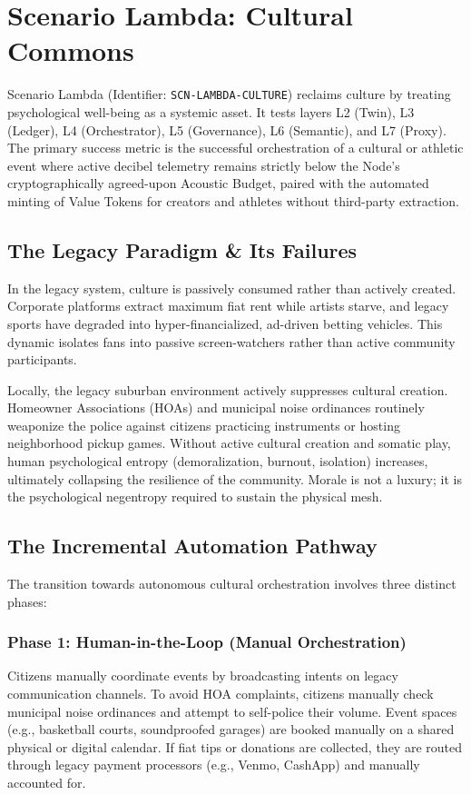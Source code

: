 \chapter{Scenario Lambda: Cultural Commons}
\label{ch:scenario_lambda}

Scenario Lambda (Identifier: \texttt{SCN-LAMBDA-CULTURE}) reclaims culture by treating psychological well-being as a systemic asset. It tests layers L2 (Twin), L3 (Ledger), L4 (Orchestrator), L5 (Governance), L6 (Semantic), and L7 (Proxy). The primary success metric is the successful orchestration of a cultural or athletic event where active decibel telemetry remains strictly below the Node's cryptographically agreed-upon Acoustic Budget, paired with the automated minting of Value Tokens for creators and athletes without third-party extraction.

\section{The Legacy Paradigm \& Its Failures}
In the legacy system, culture is passively consumed rather than actively created. Corporate platforms extract maximum fiat rent while artists starve, and legacy sports have degraded into hyper-financialized, ad-driven betting vehicles. This dynamic isolates fans into passive screen-watchers rather than active community participants.

Locally, the legacy suburban environment actively suppresses cultural creation. Homeowner Associations (HOAs) and municipal noise ordinances routinely weaponize the police against citizens practicing instruments or hosting neighborhood pickup games. Without active cultural creation and somatic play, human psychological entropy (demoralization, burnout, isolation) increases, ultimately collapsing the resilience of the community. Morale is not a luxury; it is the psychological negentropy required to sustain the physical mesh.

\section{The Incremental Automation Pathway}
The transition towards autonomous cultural orchestration involves three distinct phases:

\subsection{Phase 1: Human-in-the-Loop (Manual Orchestration)}
Citizens manually coordinate events by broadcasting intents on legacy communication channels. To avoid HOA complaints, citizens manually check municipal noise ordinances and attempt to self-police their volume. Event spaces (e.g., basketball courts, soundproofed garages) are booked manually on a shared physical or digital calendar. If fiat tips or donations are collected, they are routed through legacy payment processors (e.g., Venmo, CashApp) and manually accounted for.


